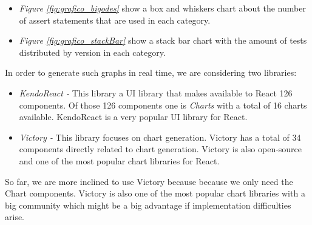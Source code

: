 \documentclass[runningheads]{llncs}
\begin{document}
\begin{itemize}
\item \emph{Figure \ref{fig:grafico_bigodes}} show a box and whiskers chart about the number of assert statements that are used in each category.
\item \emph{Figure \ref{fig:grafico_stackBar}} show a stack bar chart with the amount of tests distributed by version in each category.
\end{itemize}

In order to generate such graphs in real time, we are considering two libraries:

\begin{itemize}
\item \emph{KendoReact\cite{KendoReact} -} This library a UI library that makes available to React 126 components. Of those 126 components one is \emph{Charts} with a total of 16 charts available. KendoReact is a very popular UI library for React.
\item \emph{Victory\cite{Victory} -} This library focuses on chart generation. Victory has a total of 34 components directly related to chart generation. Victory is also open-source and one of the most popular chart libraries for React.
\end{itemize}

So far, we are more inclined to use Victory because because we only need the Chart components. Victory is also one of the most popular chart libraries with a big community which might be a big advantage if implementation difficulties arise. 
\end{document}
